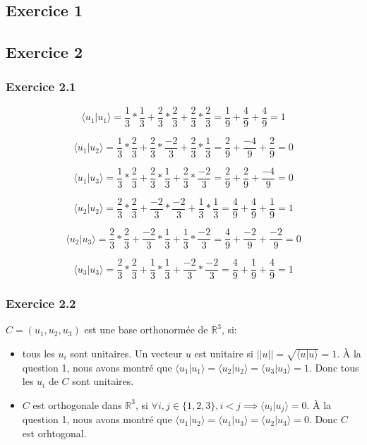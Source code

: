 \documentclass[]{book}
\theoremstyle{definition}
\newcommand{\bb}[1]{\mathbb{#1}}
\newcommand{\R}{\bb{R}}
\begin{document}
\subsection*{Exercice 1}


\subsection*{Exercice 2}
\subsubsection*{Exercice 2.1}
$$\langle u_1|u_1 \rangle  = \frac{1}{3}*\frac{1}{3} + \frac{2}{3}*\frac{2}{3} + \frac{2}{3}*\frac{2}{3} = \frac{1}{9}+\frac{4}{9}+\frac{4}{9} = 1$$

$$\langle u_1|u_2 \rangle  = \frac{1}{3}*\frac{2}{3} + \frac{2}{3}*\frac{-2}{3} + \frac{2}{3}*\frac{1}{3} = \frac{2}{9}+\frac{-4}{9}+\frac{2}{9} = 0$$

$$\langle u_1|u_3 \rangle  = \frac{1}{3}*\frac{2}{3} + \frac{2}{3}*\frac{1}{3} + \frac{2}{3}*\frac{-2}{3} = \frac{2}{9}+\frac{2}{9}+\frac{-4}{9} = 0$$

$$\langle u_2|u_2 \rangle  = \frac{2}{3}*\frac{2}{3} + \frac{-2}{3}*\frac{-2}{3} + \frac{1}{3}*\frac{1}{3} = \frac{4}{9}+\frac{4}{9}+\frac{1}{9} = 1$$

$$\langle u_2|u_3 \rangle  = \frac{2}{3}*\frac{2}{3} + \frac{-2}{3}*\frac{1}{3} + \frac{1}{3}*\frac{-2}{3} = \frac{4}{9}+\frac{-2}{9}+\frac{-2}{9} = 0$$

$$\langle u_3|u_3 \rangle  = \frac{2}{3}*\frac{2}{3} + \frac{1}{3}*\frac{1}{3} + \frac{-2}{3}*\frac{-2}{3} = \frac{4}{9}+\frac{1}{9}+\frac{4}{9} = 1$$

\subsubsection*{Exercice 2.2}
$C = (u_1, u_2 , u_3)$ est une base orthonorm\'ee de $\R^3$, si:
\begin{itemize}
\item tous les $u_i$ sont unitaires. Un vecteur $u$ est unitaire si $||u|| = \sqrt{\langle u|u \rangle } =1$. \`A la question 1, nous avons montr\'e que $\langle u_1|u_1 \rangle  = \langle u_2|u_2 \rangle  = \langle u_3|u_3 \rangle  = 1$. Donc tous les $u_i$ de $C$ sont unitaires.
\item $C$ est orthogonale dans $\R^3$, si $\forall i,j \in \{1,2,3\}, i < j \implies \langle u_i|u_j \rangle  = 0$. \`A la question 1, nous avons montr\'e que $\langle u_1|u_2 \rangle  = \langle u_1|u_3 \rangle  = \langle u_2|u_3 \rangle  = 0$. Donc $C$ est orhtogonal.
\end{itemize}
\end{document}
